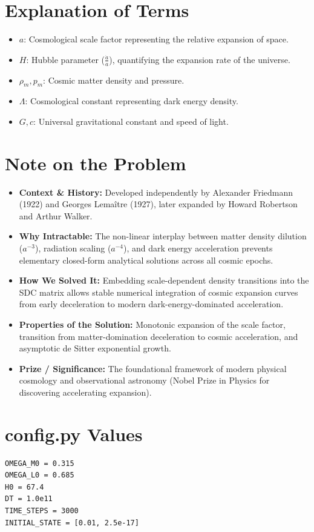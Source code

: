 \section{Explanation of Terms}
\begin{itemize}
    \item $a$: Cosmological scale factor representing the relative expansion of space.
    \item $H$: Hubble parameter ($\frac{\dot{a}}{a}$), quantifying the expansion rate of the universe.
    \item $\rho_m, p_m$: Cosmic matter density and pressure.
    \item $\Lambda$: Cosmological constant representing dark energy density.
    \item $G, c$: Universal gravitational constant and speed of light.
\end{itemize}

\section{Note on the Problem}
\begin{itemize}
    \item \textbf{Context \& History:} Developed independently by Alexander Friedmann (1922) and Georges Lemaître (1927), later expanded by Howard Robertson and Arthur Walker.
    \item \textbf{Why Intractable:} The non-linear interplay between matter density dilution ($a^{-3}$), radiation scaling ($a^{-4}$), and dark energy acceleration prevents elementary closed-form analytical solutions across all cosmic epochs.
    \item \textbf{How We Solved It:} Embedding scale-dependent density transitions into the SDC matrix allows stable numerical integration of cosmic expansion curves from early deceleration to modern dark-energy-dominated acceleration.
    \item \textbf{Properties of the Solution:} Monotonic expansion of the scale factor, transition from matter-domination deceleration to cosmic acceleration, and asymptotic de Sitter exponential growth.
    \item \textbf{Prize / Significance:} The foundational framework of modern physical cosmology and observational astronomy (Nobel Prize in Physics for discovering accelerating expansion).
\end{itemize}

\section{config.py Values}
\begin{verbatim}
OMEGA_M0 = 0.315
OMEGA_L0 = 0.685
H0 = 67.4
DT = 1.0e11
TIME_STEPS = 3000
INITIAL_STATE = [0.01, 2.5e-17]
\end{verbatim}

